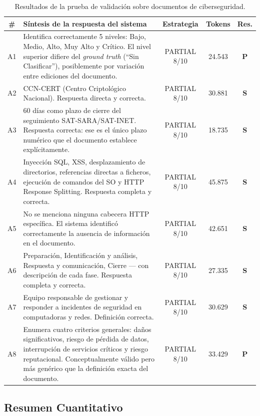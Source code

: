 \begin{table}[ht]
\centering
\renewcommand{\arraystretch}{1.4}
\caption{Resultados de la prueba de validación sobre documentos de ciberseguridad.}
\label{tab:resultados_cyber}
\begin{tabularx}{\textwidth}{|c|X|c|c|c|}
\hline
\textbf{\#} & \textbf{Síntesis de la respuesta del sistema} & \textbf{Estrategia} & \textbf{Tokens} & \textbf{Res.} \\ \hline
A1 & Identifica correctamente 5 niveles: Bajo, Medio, Alto, Muy Alto y Crítico. El nivel superior difiere del \textit{ground truth} (``Sin Clasificar''), posiblemente por variación entre ediciones del documento. & PARTIAL 8/10 & 24.543 & \textbf{P} \\ \hline
A2 & CCN-CERT (Centro Criptológico Nacional). Respuesta directa y correcta. & PARTIAL 8/10 & 30.881 & \textbf{S} \\ \hline
A3 & 60 días como plazo de cierre del seguimiento SAT-SARA/SAT-INET. Respuesta correcta: ese es el único plazo numérico que el documento establece explícitamente. & PARTIAL 8/10 & 18.735 & \textbf{S} \\ \hline
A4 & Inyección SQL, XSS, desplazamiento de directorios, referencias directas a ficheros, ejecución de comandos del SO y HTTP Response Splitting. Respuesta completa y correcta. & PARTIAL 8/10 & 45.875 & \textbf{S} \\ \hline
A5 & No se menciona ninguna cabecera HTTP específica. El sistema identificó correctamente la ausencia de información en el documento. & PARTIAL 8/10 & 42.651 & \textbf{S} \\ \hline
A6 & Preparación, Identificación y análisis, Respuesta y comunicación, Cierre — con descripción de cada fase. Respuesta completa y correcta. & PARTIAL 8/10 & 27.335 & \textbf{S} \\ \hline
A7 & Equipo responsable de gestionar y responder a incidentes de seguridad en computadoras y redes. Definición correcta. & PARTIAL 8/10 & 30.629 & \textbf{S} \\ \hline
A8 & Enumera cuatro criterios generales: daños significativos, riesgo de pérdida de datos, interrupción de servicios críticos y riesgo reputacional. Conceptualmente válido pero más genérico que la definición exacta del documento. & PARTIAL 8/10 & 33.429 & \textbf{P} \\ \hline
\end{tabularx}
\end{table}

\subsection{Resumen Cuantitativo}

